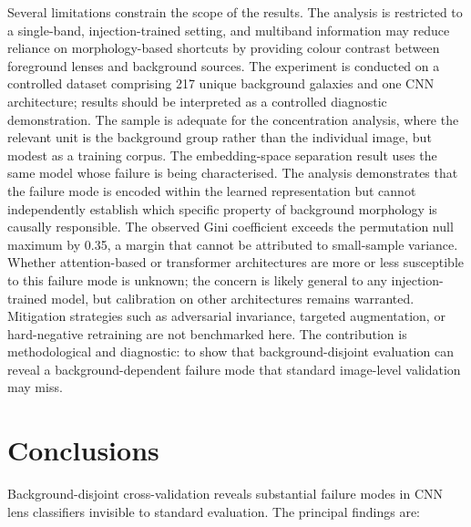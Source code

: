 \documentclass[fleqn,usenatbib]{mnras}
\begin{document}
Several limitations constrain the scope of the results. The analysis is
restricted to a single-band, injection-trained setting, and multiband
information may reduce reliance on morphology-based shortcuts by
providing colour contrast between foreground lenses and background
sources. The experiment is conducted on a controlled dataset comprising 217
unique background galaxies and one CNN architecture; results should be
interpreted as a controlled diagnostic demonstration. The sample is
adequate for the concentration analysis, where the relevant unit is the
background group rather than the individual image, but modest as a
training corpus.
The embedding-space separation result uses the same model whose failure
is being characterised. The analysis demonstrates that the failure mode
is encoded within the learned representation but cannot independently
establish which specific property of background morphology is causally
responsible. The observed Gini coefficient exceeds the permutation null
maximum by 0.35, a margin that cannot be attributed to small-sample
variance. Whether
attention-based or transformer architectures are more
or less susceptible to this failure mode is unknown; the concern is likely
general to any injection-trained model, but calibration on other
architectures remains warranted. Mitigation strategies such as
adversarial invariance, targeted augmentation, or hard-negative
retraining are not benchmarked here. The contribution is methodological
and diagnostic: to show that background-disjoint evaluation can reveal a
background-dependent failure mode that standard image-level validation
may miss.

\section{Conclusions}
\label{sec:conclusions}

Background-disjoint cross-validation reveals substantial failure modes in
CNN lens classifiers invisible to standard evaluation. The principal
findings are:
\end{document}
